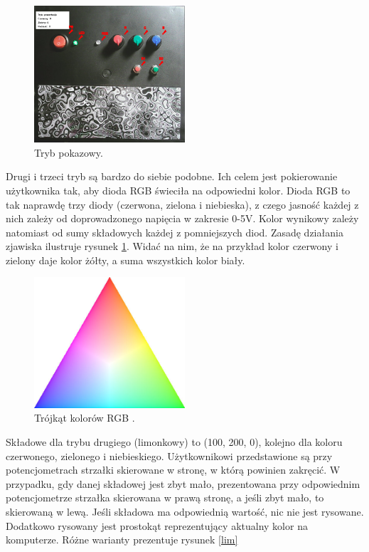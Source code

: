 \documentclass[12pt,twoside,polish]{article}
\begin{document}
\begin{figure}[h]
	\centering
	\includegraphics[width=0.5\textwidth]{pres}
	\caption{Tryb pokazowy.}
\end{figure}

Drugi i trzeci tryb są bardzo do siebie podobne. Ich celem jest pokierowanie użytkownika tak, aby dioda RGB świeciła na odpowiedni kolor. Dioda RGB to tak naprawdę trzy diody (czerwona, zielona i niebieska), z czego jasność każdej z nich zależy od doprowadzonego napięcia w zakresie 0-5V. Kolor wynikowy zależy natomiast od sumy składowych każdej z pomniejszych diod. Zasadę działania zjawiska ilustruje rysunek \ref{rgb_tri}. Widać na nim, że na przykład kolor czerwony i zielony daje kolor żółty, a suma wszystkich kolor biały.

\begin{figure}[h]
	\centering
	\includegraphics[width=0.5\textwidth]{rgb_tri}
	\caption{Trójkąt kolorów RGB \cite{rgb_tri}.}
	\label{rgb_tri}
\end{figure}

Składowe dla trybu drugiego (limonkowy) to (100, 200, 0), kolejno dla koloru czerwonego, zielonego i niebieskiego. Użytkownikowi przedstawione są przy potencjometrach strzałki skierowane w stronę, w którą powinien zakręcić. W przypadku, gdy danej składowej jest zbyt mało, prezentowana przy odpowiednim potencjometrze strzałka skierowana w prawą stronę, a jeśli zbyt mało, to skierowaną w lewą. Jeśli składowa ma odpowiednią wartość, nic nie jest rysowane. Dodatkowo rysowany jest prostokąt reprezentujący aktualny kolor na komputerze. Różne warianty prezentuje rysunek \ref{lim}
\end{document}

